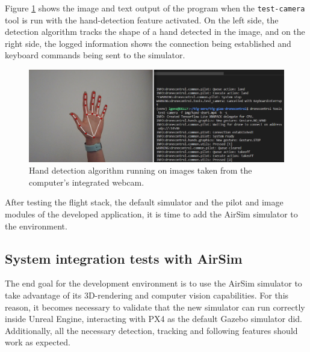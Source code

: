 Figure \ref{fig:sitl-hand} shows the image and text output of the program when the \texttt{test-camera} tool is run with the hand-detection feature activated.
On the left side, the detection algorithm tracks the shape of a hand detected in the image, and on the right side, the logged information shows the connection being established and keyboard commands being sent to the simulator.

\begin{figure}[H]
  \centering
  \includegraphics[width=\textwidth, keepaspectratio]{img/sitl-hand.png}
  \caption{Hand detection algorithm running on images taken from the computer's integrated webcam.}\label{fig:sitl-hand}
\end{figure}

After testing the flight stack, the default simulator and the pilot and image modules of the developed application, it is time to add the AirSim simulator to the environment.


\subsection{System integration tests with AirSim}
\label{sec:test-3-airsim}

The end goal for the development environment is to use the AirSim simulator to take advantage of its 3D-rendering and computer vision capabilities.
For this reason, it becomes necessary to validate that the new simulator can run correctly inside Unreal Engine, interacting with PX4 as the default Gazebo simulator did. Additionally, all the necessary detection, tracking and following features should work as expected.

